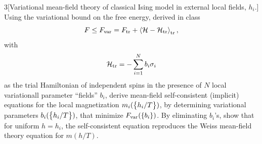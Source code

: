 \documentclass[12pt]{article}
\begin{document}
\newpage
\begin{problem}{3}[Variational mean-field theory of classical Ising model in
    external local fields, $h_i$.]
Using the variational bound on the free energy, derived in class
\begin{equation}
    F\leq F_{\text{var}}=F_{\text{tr}}+\expval{\mathcal{H}-\mathcal{H}_{\text{tr}}}_{\text{tr}}, 
\end{equation}
with
\begin{equation}
    \mathcal{H}_{\text{tr}}=-\sum_{i=1}^Nb_i\sigma_i
\end{equation}
as the trial Hamiltonian of independent spins in the presence of $N$ local
variationall parameter ``fields'' $b_i$, derive mean-field self-consistent
(implicit) equations for the local magnetization $m_i(\qty{h_i/T})$, by
determining variational parameters $b_i(\qty{h_i/T})$, that minimize
$F_{\text{var}}(\qty{b_i})$. By eliminating $b_i$'s, show that for uniform $h=h_i$,
the self-consistent equation reproduces the Weiss mean-field theory equation for
$m(h/T)$.
\begin{solution}
\end{solution}
\end{problem}
\newpage
\end{document}
